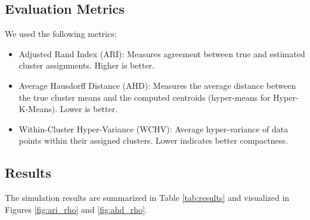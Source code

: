 \documentclass[twoside]{article}
\begin{document}
\subsection{Evaluation Metrics}
We used the following metrics:
\begin{itemize}
    \item Adjusted Rand Index (ARI): Measures agreement between true and estimated cluster assignments. Higher is better.
    \item Average Hausdorff Distance (AHD): Measures the average distance between the true cluster means and the computed centroids (hyper-means for Hyper-K-Means). Lower is better.
    \item Within-Cluster Hyper-Variance (WCHV): Average hyper-variance of data points within their assigned clusters. Lower indicates better compactness.
\end{itemize}

\subsection{Results}
The simulation results are summarized in Table \ref{tab:results} and visualized in Figures \ref{fig:ari_rho} and \ref{fig:ahd_rho}.

\end{document}
